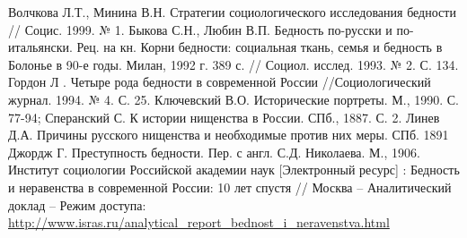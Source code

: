 \renewcommand{\bibname}{\centerline{\normalsize{Список литературы}}}
\begin{thebibliography}{99}
     Волчкова Л.Т., Минина В.Н. Стратегии социологического 
        исследования бедности // Социс. 1999. № 1.
     Быкова С.Н., Любин В.П. Бедность по-русски и 
        по-итальянски. Рец. на кн. Корни бедности: социальная ткань, семья и 
        бедность в Болонье в 90-е годы. Милан, 1992 г. 389 с. 
        // Социол. исслед. 1993. № 2. С. 134.
     Гордон Л . Четыре рода бедности в современной 
        России //Социологический журнал. 1994. № 4. С. 25.
     Ключевский В.О. Исторические портреты. М., 1990. С. 
        77-94; Сперанский С. К истории нищенства в России. СПб., 1887. С. 2.
     Линев Д.А. Причины русского нищенства и необходимые 
        против них меры. СПб. 1891
     Джордж Г. Преступность бедности. Пер. с англ. С.Д. 
        Николаева. М., 1906.
     Институт социологии Российской академии наук 
        [Электронный ресурс] : Бедность и неравенства в современной России: 
        10 лет спустя // Москва -- Аналитический доклад -- Режим доступа: 
        \url{http://www.isras.ru/analytical_report_bednost_i_neravenstva.html} 
\end{thebibliography}

\newpage